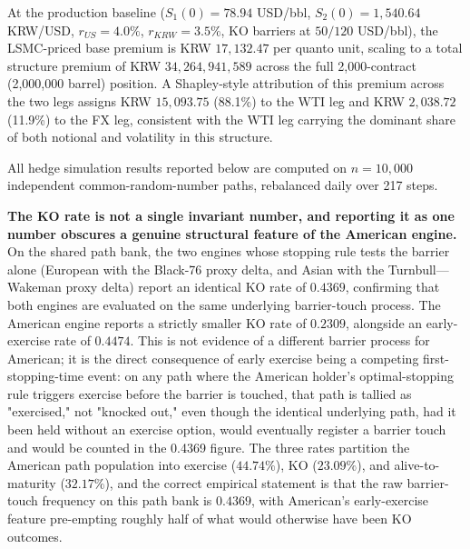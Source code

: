 \documentclass[11pt,a4paper]{article}
\begin{document}
At the production baseline ($S_1(0)=78.94$ USD/bbl, $S_2(0)=1{,}540.64$ KRW/USD, $r_{US}=4.0\%$, $r_{KRW}=3.5\%$, KO barriers at $50/120$ USD/bbl), the LSMC-priced base premium is KRW $17{,}132.47$ per quanto unit, scaling to a total structure premium of KRW $34{,}264{,}941{,}589$ across the full 2{,}000-contract (2{,}000{,}000 barrel) position. A Shapley-style attribution of this premium across the two legs assigns KRW $15{,}093.75$ (88.1\%) to the WTI leg and KRW $2{,}038.72$ (11.9\%) to the FX leg, consistent with the WTI leg carrying the dominant share of both notional and volatility in this structure.

All hedge simulation results reported below are computed on $n=10{,}000$ independent common-random-number paths, rebalanced daily over 217 steps.

\textbf{The KO rate is not a single invariant number, and reporting it as one number obscures a genuine structural feature of the American engine.} On the shared path bank, the two engines whose stopping rule tests the barrier alone (European with the Black-76 proxy delta, and Asian with the Turnbull---Wakeman proxy delta) report an identical KO rate of $0.4369$, confirming that both engines are evaluated on the same underlying barrier-touch process. The American engine reports a strictly smaller KO rate of $0.2309$, alongside an early-exercise rate of $0.4474$. This is not evidence of a different barrier process for American; it is the direct consequence of early exercise being a competing first-stopping-time event: on any path where the American holder's optimal-stopping rule triggers exercise before the barrier is touched, that path is tallied as "exercised," not "knocked out," even though the identical underlying path, had it been held without an exercise option, would eventually register a barrier touch and would be counted in the 0.4369 figure. The three rates partition the American path population into exercise ($44.74\%$), KO ($23.09\%$), and alive-to-maturity ($32.17\%$), and the correct empirical statement is that the raw barrier-touch frequency on this path bank is $0.4369$, with American's early-exercise feature pre-empting roughly half of what would otherwise have been KO outcomes.
\end{document}
